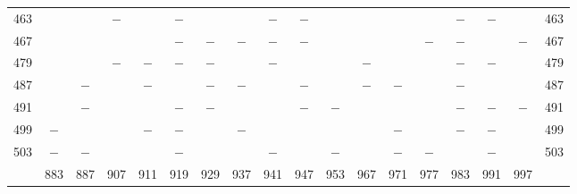\begin{center}
\begin{tabular}{r|c|c|c|c|c|c|c|c|c|c|c|c|c|c|c|c|r}
463 &  &  & $-$ &  & $-$ &  &  & $-$ & $-$ &  &  &  &  & $-$ & $-$ &  & 463\\
467 &  &  &  &  & $-$ & $-$ & $-$ & $-$ & $-$ &  &  &  & $-$ & $-$ &  & $-$ & 467\\
479 &  &  & $-$ & $-$ & $-$ & $-$ &  & $-$ &  &  & $-$ &  &  & $-$ & $-$ &  & 479\\
487 &  & $-$ &  & $-$ &  & $-$ & $-$ &  & $-$ &  & $-$ & $-$ &  & $-$ &  &  & 487\\
491 &  & $-$ &  &  & $-$ & $-$ &  &  & $-$ & $-$ &  &  &  & $-$ & $-$ & $-$ & 491\\
499 & $-$ &  &  & $-$ & $-$ &  & $-$ &  &  &  &  & $-$ &  & $-$ & $-$ &  & 499\\
503 & $-$ & $-$ &  &  & $-$ &  &  & $-$ &  & $-$ &  & $-$ & $-$ &  & $-$ &  & 503\\
\hline
 & 883 & 887 & 907 & 911 & 919 & 929 & 937 & 941 & 947 & 953 & 967 & 971 & 977 & 983 & 991 & 997 & \\
\hline
\end{tabular}\endgroup\end{center}

